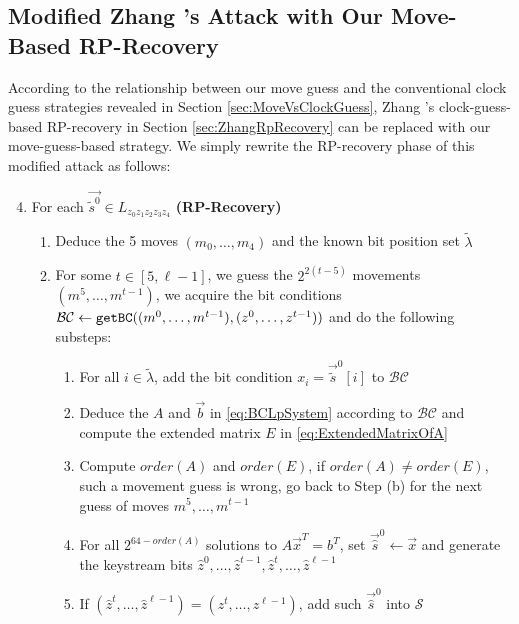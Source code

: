 \subsection{Modified Zhang \etal's Attack with Our Move-Based RP-Recovery}\label{sec:OurRpRecovery}
According to the relationship between our move guess and the conventional clock guess strategies revealed in Section \ref{sec:MoveVsClockGuess}, Zhang \etal's clock-guess-based RP-recovery in Section \ref{sec:ZhangRpRecovery} can be replaced with our move-guess-based strategy.
We simply rewrite the RP-recovery phase of this modified attack as follows:
\begin{enumerate}
\setcounter{enumi}{3}
   \item For each $\vec{\tilde{s}^0}\in L_{z_0z_1z_2z_3z_4}$ \textbf{(RP-Recovery)}
   \begin{enumerate}
     \item Deduce the 5 moves $(m_0,\ldots, m_4)$ and the known bit position set $\tilde{\lambda}$
     \item For some $t \in [5,\ell-1]$, we guess the $2^{2(t-5)}$ movements $(m^5,\ldots, m^{t-1})$, we acquire the bit conditions $\mathcal{BC}\leftarrow {\tt getBC}((m^0,\ldots, m^{t-1}), (z^0,\ldots, z^{t-1}))$ and do the following substeps:
     \begin{enumerate}
        \item For all $i\in \tilde{\lambda}$, add the bit condition $x_i=\vec{\tilde{s}}^0[i]$ to $\mathcal{BC}$
        \item Deduce the $A$ and $\vec b$ in \eqref{eq:BCLpSystem} according to $\mathcal{BC}$ and compute the extended matrix $E$ in \eqref{eq:ExtendedMatrixOfA}
        \item Compute $order(A)$ and $order(E)$, if $order(A)\neq order(E)$, such a movement guess is wrong, go back to Step (b) for the next guess of moves $m^5,\ldots, m^{t-1}$
        \item For all $2^{64-order(A)}$ solutions to $A\vec x^T=b^T$, set $\vec{\hat{s}}^0\leftarrow \vec x$ and generate the keystream bits $\hat{z}^0,\ldots, \hat{z}^{t-1},\hat{z}^{t},\ldots, \hat{z}^{\ell-1}$
        \item If $(\hat{z}^{t},\ldots, \hat{z}^{\ell-1})=(z^{t},\ldots, z^{\ell-1})$, add such $\vec{\hat{s}}^0$ into $\mathcal{S}$
      \end{enumerate}
   \end{enumerate}
\end{enumerate}

